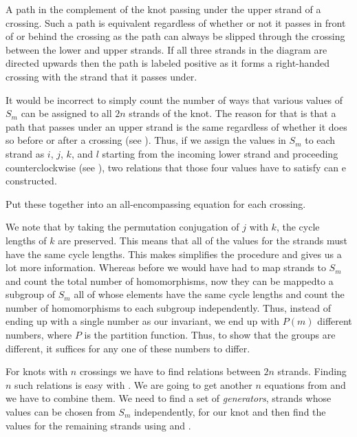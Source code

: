 \begin{paper}
{\vspace{-5em}\hfill{}}
{A path in the complement of the knot passing under the
upper strand of a crossing.
Such a path is equivalent regardless of whether or not it passes in front of or
behind the crossing as the path can always be slipped through the crossing
between the lower and upper strands.
If all three strands in the diagram are directed upwards then the path is
labeled positive as it forms a right-handed crossing with the strand that it
passes under.}

It would be incorrect to simply count the number of ways that various values of
$S_m$ can be assigned to all $2n$ strands of the knot.
The reason for that is that a path that passes under an upper strand is the same
regardless of whether it does so before or after a crossing (see \figPasses).
Thus, if we assign the values in $S_m$ to each strand as $i$, $j$, $k$, and $l$
starting from the incoming lower strand and proceeding counterclockwise (see
\figX), two relations that those four values have to satisfy can e constructed.


Put these together into an all-encompassing equation for each crossing.



We note that by taking the permutation conjugation of $j$ with $k$, the cycle
lengths of $k$ are preserved.
This means that all of the values for the strands must have the same cycle
lengths.
This makes simplifies the procedure and gives us a lot more information.
Whereas before we would have had to map strands to $S_m$ and count the total
number of homomorphisms, now they can be mappedto a subgroup of $S_m$ all of
whose elements have the same cycle lengths and count the number of homomorphisms
to each subgroup independently.
Thus, instead of ending up with a single number as our invariant, we end up with
$P(m)$ different numbers, where $P$ is the partition function.
Thus, to show that the groups are different, it suffices for any one of these
numbers to differ.

For knots with $n$ crossings we have to find relations between $2n$ strands.
Finding $n$ such relations is easy with \eqUpper.
We are going to get another $n$ equations from \eqBoth and we have to combine them.
We need to find a set of \textit{generators}, strands whose values can be chosen
from $S_m$ independently, for our knot and then find the values for the
remaining strands using \eqUpper and \eqBoth.


\end{paper}
